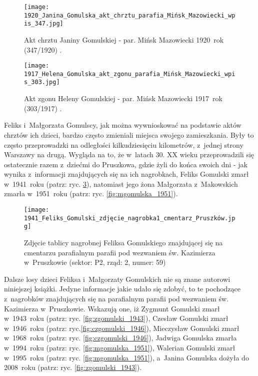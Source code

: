 \begin{figure}[!ht]
    \vspace*{0.5cm}
    \centering \texttt{[image: 
        1920\_Janina\_Gomulska\_akt\_chrztu\_parafia\_Mińsk\_Mazowiecki\_wpis\_347.jpg]}
    \captionsetup{format=hang}
    \caption{Akt chrztu Janiny Gomulskiej - par. Mińsk Mazowiecki 
    1920~rok (347/1920) 
    \cite{par_minsk2}.}
    \label{fig:jgomulska_1920}
\end{figure}

\begin{figure}[!ht]
    \vspace*{0.5cm}
    \centering \texttt{[image: 
        1917\_Helena\_Gomulska\_akt\_zgonu\_parafia\_Mińsk\_Mazowiecki\_wpis\_303.jpg]}
    \captionsetup{format=hang}
    \caption{Akt zgonu Heleny Gomulskiej - par. Mińsk Mazowiecki 
    1917~rok (303/1917) 
    \cite{par_minsk2}.}
    \label{fig:hgomulska_1917_2}
\end{figure}

Feliks i~Małgorzata Gomulscy, jak można wywnioskować na podstawie aktów 
chrztów ich dzieci, bardzo często zmieniali miejsca swojego zamieszkania. 
Były to często przeprowadzki na odległości kilkudziesięciu kilometrów, 
z~jednej strony Warszawy na drugą. Wygląda na to, że w~latach 30. XX wieku 
przeprowadzili się ostatecznie razem z~dziećmi do Pruszkowa, gdzie żyli do 
końca swoich dni - jak wynika z~informacji znajdujących się na ich nagrobkach, 
Feliks Gomulski zmarł w~1941~roku (patrz: ryc. \ref{fig:fgomulski_1941}), 
natomiast jego żona Małgorzata z~Makowskich zmarła w~1951~roku (patrz: ryc. 
\ref{fig:mgomulska_1951}).

\begin{figure}[!ht]
    \vspace*{0.4cm}
    \centering \texttt{[image: 
        1941\_Feliks\_Gomulski\_zdjęcie\_nagrobka1\_cmentarz\_Pruszków.jpg]}
    \captionsetup{format=hang}
    \caption{Zdjęcie tablicy nagrobnej Feliksa Gomulskiego znajdującej się na
    cmentarzu parafialnym parafii pod wezwaniem św. Kazimierza w~Pruszkowie 
    (sektor: P2, rząd: 2, numer: 59)}
    \label{fig:fgomulski_1941}
\end{figure}

Dalsze losy dzieci Feliksa i~Małgorzaty Gomulskich nie są znane autorowi 
niniejszej książki. Jedyne informacje jakie udało się zdobyć, to te 
pochodzące z~nagrobków znajdujących się na parafialnym parafii pod wezwaniem
św. Kazimierza w~Pruszkowie.  Wskazują one, iż Zygmunt Gomulski zmarł
w~1943~roku (patrz: ryc. \ref{fig:zgomulski_1943}), Czesław Gomulski zmarł
w~1946~roku (patrz: ryc.\ref{fig:czgomulski_1946}), Mieczysław Gomulski zmarł
w~1968~roku (patrz: ryc. \ref{fig:czgomulski_1946}), Jadwiga Gomulska zmarła
w~1994~roku (patrz: ryc. \ref{fig:mgomulska_1951}), Walerian Gomulski zmarł
w~1995~roku (patrz: ryc. \ref{fig:mgomulska_1951}), a~Janina Gomulska dożyła
do 2008~roku (patrz: ryc. \ref{fig:zgomulski_1943}).

